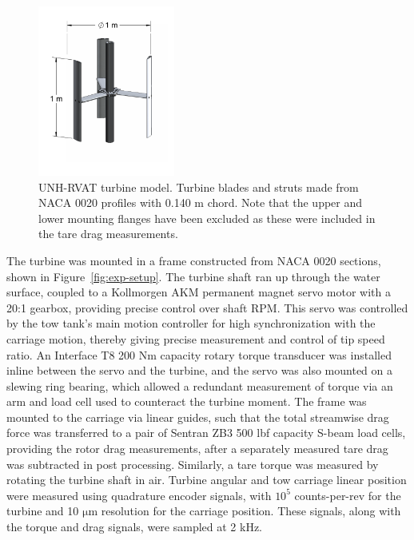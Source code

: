 \documentclass[energies,article,accept,moreauthors,pdftex,12pt,a4paper]{mdpi}
\begin{document}
\begin{figure}[ht!]
\centering

\includegraphics[width=0.4\textwidth]{figures/turbine}

\caption{UNH-RVAT turbine model. Turbine blades and struts made from NACA 0020
    profiles with 0.140 m chord. Note that the upper and lower mounting flanges have
    been excluded as these were included in the tare drag measurements.}

\label{fig:turbine}
\end{figure}

The turbine was mounted in a frame constructed from NACA 0020 sections, shown in
Figure~\ref{fig:exp-setup}. The turbine shaft ran up through the water surface,
coupled to a Kollmorgen AKM permanent magnet servo motor with a 20:1 gearbox,
providing precise control over shaft RPM. This servo was controlled by the tow
tank's main motion controller for high synchronization with the carriage motion,
thereby giving precise measurement and control of tip speed ratio. An Interface
T8 200 Nm capacity rotary torque transducer was installed inline between the
servo and the turbine, and the servo was also mounted on a slewing ring bearing,
which allowed a redundant measurement of torque via an arm and load cell used to
counteract the turbine moment. The frame was mounted to the carriage via linear
guides, such that the total streamwise drag force was transferred to a pair of
Sentran ZB3 500 lbf capacity S-beam load cells, providing the rotor drag
measurements, after a separately measured tare drag was subtracted in post
processing. Similarly, a tare torque was measured by rotating the turbine shaft
in air. Turbine angular and tow carriage linear position were measured using
quadrature encoder signals, with $10^5$ counts-per-rev for the turbine and 10
$\mathrm{\mu m}$ resolution for the carriage position. These signals, along with
the torque and drag signals, were sampled at 2 kHz.
\end{document}
